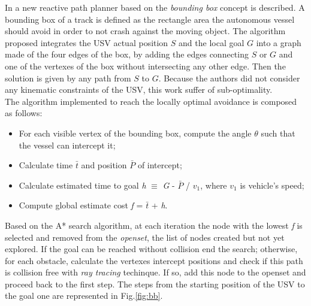 \documentclass[12pt]{article}
\begin{document}
              \indent In \parencite{Casalino2009} a new reactive path planner based on the \textit{bounding box} concept is described. A bounding box of a track is defined as the rectangle area the autonomous vessel should avoid in order to not crash against the moving object. The algorithm proposed integrates the USV actual position $S$ and the local goal $G$ into a graph made of the four edges of the box, by adding the edges connecting $S$ or $G$ and one of the vertexes of the box without intersecting any other edge. Then the solution is given by any path from $S$ to $G$. Because the authors did not consider any kinematic constraints of the USV, this work suffer of sub-optimality.\\
              The algorithm implemented to reach the locally optimal avoidance is composed as follows:
                    \begin{itemize}
                          \item For each visible vertex of the bounding box, compute the angle $\theta$ such that the vessel can intercept it;
                          \item Calculate time \textit{$\bar{t}$} and position $\bar{P}$ of intercept;
                          \item Calculate estimated time to goal \textit{h} $\equiv$ \textit{G} - \textit{$\bar{P}$} / \textit{$v_1$}, where \textit{$v_1$} is vehicle's speed;
                          \item Compute global estimate cost \textit{f} = \textit{$\bar{t}$} + \textit{h}.
                    \end{itemize}
              Based on the A* search algorithm, at each iteration the node with the lowest \textit{f} is selected and removed from the \textit{openset}, the list of nodes created but not yet explored. If the goal can be reached without collision end the search; otherwise, for each obstacle, calculate the vertexes intercept positions and check if this path is collision free with \textit{ray tracing} techinque. If so, add this node to the openset and proceed back to the first step. The steps from the starting position of the USV to the goal one are represented in Fig.\ref{fig:bb}.
\end{document}
